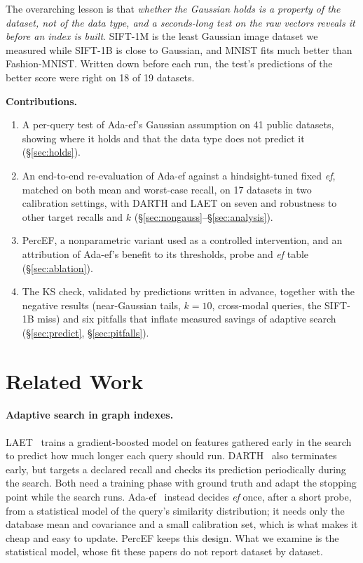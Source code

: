 \documentclass[sigconf,review=false,screen]{acmart}
\newcommand{\ef}{\textit{ef}}
\begin{document}
The overarching lesson is that \emph{whether the Gaussian holds is a property of the dataset, not
of the data type, and a seconds-long test on the raw vectors reveals it before an index is built}.
SIFT-1M is the least Gaussian image dataset we measured while SIFT-1B is close to Gaussian, and
MNIST fits much better than Fashion-MNIST. Written down before each run, the test's predictions of
the better score were right on 18 of 19 datasets.

\textbf{Contributions.}
\begin{enumerate}
\item A per-query test of Ada-ef's Gaussian assumption on 41 public datasets, showing where it holds
  and that the data type does not predict it (\S\ref{sec:holds}).
\item An end-to-end re-evaluation of Ada-ef against a hindsight-tuned fixed \ef{}, matched on both
  mean and worst-case recall, on 17 datasets in two calibration settings, with DARTH and LAET on
  seven and robustness to other target recalls and $k$ (\S\ref{sec:nongauss}--\S\ref{sec:analysis}).
\item PercEF, a nonparametric variant used as a controlled intervention, and an attribution of
  Ada-ef's benefit to its thresholds, probe and \ef{} table (\S\ref{sec:ablation}).
\item The KS check, validated by predictions written in advance, together with the negative results
  (near-Gaussian tails, $k = 10$, cross-modal queries, the SIFT-1B miss) and six pitfalls that
  inflate measured savings of adaptive search (\S\ref{sec:predict}, \S\ref{sec:pitfalls}).
\end{enumerate}

\section{Related Work}

\paragraph{Adaptive search in graph indexes.}
LAET~\cite{li2020laet} trains a gradient-boosted model on features gathered early in the search to
predict how much longer each query should run. DARTH~\cite{chatzakis2026darth} also terminates
early, but targets a declared recall and checks its prediction periodically during the search.
Both need a training phase with ground truth and adapt the stopping point while the search runs.
Ada-ef~\cite{zhang2026adaef} instead decides \ef{} once, after a short probe, from a statistical
model of the query's similarity distribution; it needs only the database mean and covariance and a
small calibration set, which is what makes it cheap and easy to update. PercEF keeps this design.
What we examine is the statistical model, whose fit these papers do not report dataset by dataset.
\end{document}
